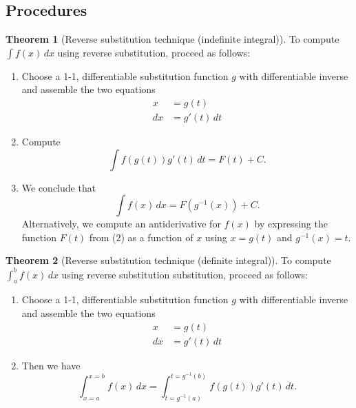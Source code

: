 \documentclass[11pt]{article}
\theoremstyle{definition}
\newtheorem*{comment}{Comment}
\theoremstyle{named}
\newtheorem*{namedtheorem}{Theorem}
\numberwithin{myalgctr}{section}
\begin{document}
\subsection*{Procedures}
\begin{namedtheorem}[Reverse substitution technique (indefinite integral)] To compute $\displaystyle\int f(x)\, dx$ using reverse substitution, proceed as follows:
\begin{enumerate}[topsep=0pt, itemsep=0pt]
  \item Choose a 1-1, differentiable substitution function $g$ with differentiable inverse and assemble the two equations
  \begin{align*}
    x&=g(t)\\
    dx&=g'(t)\, dt
  \end{align*}
  \item Compute
  \[
  \int f(g(t))g'(t)\, dt=F(t)+C.
  \]
  \item We conclude that
  \[
  \int f(x)\, dx=F(g^{-1}(x))+C.
  \]
  Alternatively, we compute an antiderivative for $f(x)$ by expressing the function $F(t)$ from (2) as a function of $x$ using $x=g(t)$ and $g^{-1}(x)=t$.
\end{enumerate}

\end{namedtheorem}
\begin{samepage}
\begin{namedtheorem}[Reverse substitution technique (definite integral)] To compute $\displaystyle\int_a^b f(x)\, dx$ using reverse substitution substitution, proceed as follows:
\begin{enumerate}[topsep=0pt, itemsep=0pt]
  \item Choose a 1-1, differentiable substitution function $g$ with differentiable inverse and assemble the two equations
  \begin{align*}
    x&=g(t)\\
    dx&=g'(t)\, dt
  \end{align*}
  \item
  Then we have
  \[
  \displaystyle\int_{x=a}^{x=b} f(x)\, dx=\int_{t=g^{-1}(a)}^{t=g^{-1}(b)}f(g(t))g'(t)\, dt.
  \]
\end{enumerate}

\end{namedtheorem}
\end{samepage}
\begin{comment}
What is the difference between our original (forward) substitution and reverse subsitution?
\begin{itemize}
  \item Forward substitution allows us to find an antiderivative of $f(u(x))u'(x)$ from an antiderivative of $f(x)$: namely,
  \[
  F(x) \text{ is an antiderivative of } f(x)\implies F(u(x)) \text{ is an antiderivative  of } f(u(x))u'(x).
  \]
  \item Reverse substitution allows us to find an antiderivative of $f(x)$ from an antiderivative of $f(g(t))g'(t)$: namely,
  \[
  F(t) \text{ is an antiderivative of } f(g(t))g'(t)\implies F(g^{-1}(x)) \text{ is an antiderivative  of } f(x).
  \]
\end{itemize}
\end{comment}
\end{document}
